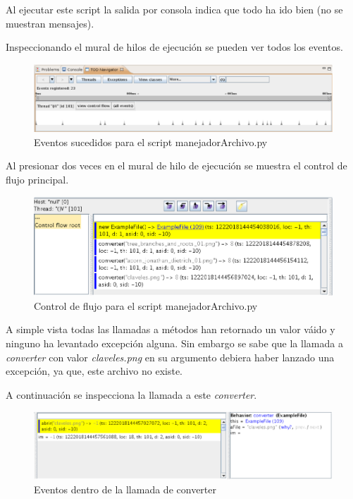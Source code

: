 \documentclass[12pt,legalpaper]{report}
\begin{document}
Al ejecutar este script la salida por consola indica que todo ha ido bien (no se muestran mensajes).

Inspeccionando el mural de hilos de ejecución se pueden ver todos los eventos.

\begin{figure}[h]
	\centering
	\includegraphics[scale=0.5]{images/manejadorArchivo/threadMurals.eps}
	\caption{Eventos sucedidos para el script manejadorArchivo.py}
\end{figure}	

Al presionar dos veces en el mural de hilo de ejecución se muestra el control de flujo principal.

\begin{figure}[h]
	\centering
	\includegraphics[scale=0.6]{images/manejadorArchivo/controlFlow.eps}
	\caption{Control de flujo para el script manejadorArchivo.py}
\end{figure}

A simple vista todas las llamadas a métodos han retornado un valor váido y ninguno ha levantado excepción alguna.  Sin embargo se sabe que la llamada a \textit{converter} con valor \textit{claveles.png} en su argumento debiera haber lanzado una excepción, ya que, este archivo no existe.

A continuación se inspecciona la llamada a este \textit{converter}.

\begin{figure}[h]
	\centering
	\includegraphics[scale=0.5]{images/manejadorArchivo/intoConverter.eps}
	\caption{Eventos dentro de la llamada de converter}
\end{figure}
\end{document}
